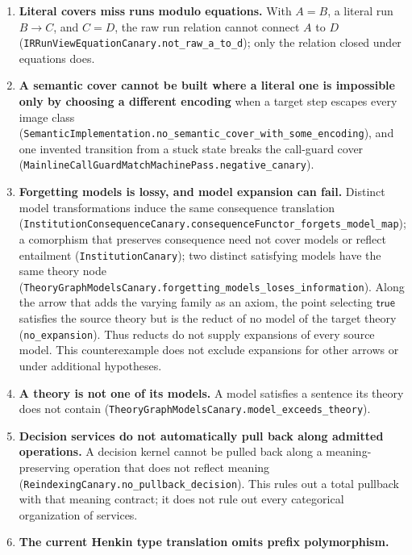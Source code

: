 \documentclass[11pt]{article}
\theoremstyle{definition}
\theoremstyle{remark}
\begin{document}
\begin{enumerate}
  $n$ outputs, so predecessor classes are infinite and the box modality has
  no finite enumeration
  (\nolinkurl{BackwardBranchingBoundary.directionalSystem_not_imageFiniteModulo}).
  Backward adequacy through enumeration is closed as a route.
\item \textbf{Literal covers miss runs modulo equations.}  With $A=B$, a
  literal run $B\to C$, and $C=D$, the raw run relation cannot connect $A$ to
  $D$ (\nolinkurl{IRRunViewEquationCanary.not_raw_a_to_d}); only the relation
  closed under equations does.
\item \textbf{A semantic cover cannot be built where a literal one is
  impossible only by choosing a different encoding} when a target step
  escapes every image class
  (\nolinkurl{SemanticImplementation.no_semantic_cover_with_some_encoding}),
  and one invented transition from a stuck state breaks the call-guard cover
  (\nolinkurl{MainlineCallGuardMatchMachinePass.negative_canary}).
\item \textbf{Forgetting models is lossy, and model expansion can fail.}
  Distinct model transformations induce the same consequence translation
  (\nolinkurl{InstitutionConsequenceCanary.consequenceFunctor_forgets_model_map});
  a comorphism that preserves consequence need not cover models or reflect
  entailment (\texttt{InstitutionCanary}); two distinct satisfying models
  have the same theory node
  (\nolinkurl{TheoryGraphModelsCanary.forgetting_models_loses_information}).
  Along the arrow that adds the varying family as an axiom, the point
  selecting $\mathsf{true}$ satisfies the source theory but is the reduct of
  no model of the target theory (\texttt{no\_expansion}). Thus reducts do
  not supply expansions of every source model. This counterexample does not
  exclude expansions for other arrows or under additional hypotheses.
\item \textbf{A theory is not one of its models.}  A model satisfies a
  sentence its theory does not contain
  (\nolinkurl{TheoryGraphModelsCanary.model_exceeds_theory}).
\item \textbf{Decision services do not automatically pull back along admitted operations.} A decision
  kernel cannot be pulled back along a meaning-preserving operation that
  does not reflect meaning (\nolinkurl{ReindexingCanary.no_pullback_decision}).
  This rules out a total pullback with that meaning contract; it does not
  rule out every categorical organization of services.
\item \textbf{The current Henkin type translation omits prefix polymorphism.}

\end{enumerate}
\end{document}
